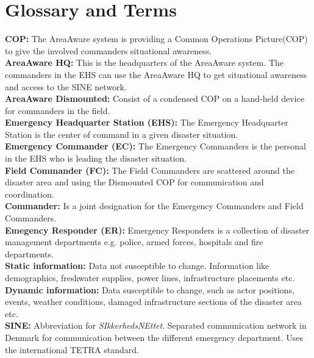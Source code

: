 
\chapter{Glossary and Terms}

\textbf{COP:} The AreaAware system is providing a Common Operations Picture(COP) to give the involved commanders situational awareness.\\

\noindent \textbf{AreaAware HQ:} This is the headquarters of the AreaAware system. The commanders in the EHS can use the AreaAware HQ to get situational awareness and access to the SINE network.\\

\noindent \textbf{AreaAware Dismounted:} Consist of a condensed COP on a hand-held device for commanders in the field.\\

\noindent \textbf{Emergency Headquarter Station (EHS):} The Emergency Headquarter Station is the center of command in a given disaster situation.\\

\noindent \textbf{Emergency Commander (EC):} The Emergency Commanders is the personal in the EHS who is leading the disaster situation.\\

\noindent \textbf{Field Commander (FC):} The Field Commanders are scattered around the disaster area and using the Dismounted COP for communication and coordination.\\

\noindent \textbf{Commander:} Is a joint designation for the Emergency Commanders and Field Commanders.\\

\noindent \textbf{Emegency Responder (ER):} Emergency Responders is a collection of disaster management departments e.g. police, armed forces, hospitals and fire departments.\\

\noindent \textbf{Static information:} Data not susceptible to change. Information like demographics, freshwater supplies, power lines, infrastructure placements etc.\\

\noindent \textbf{Dynamic information:} Data susceptible to change, such as actor positions, events, weather conditions, damaged infrastructure sections of the disaster area etc.\\

\noindent \textbf{SINE:} Abbreviation for \textit{SIkkerhedsNEttet}. Separated communication network in Denmark for communication between the different emergency department. Uses the international TETRA standard.\\

